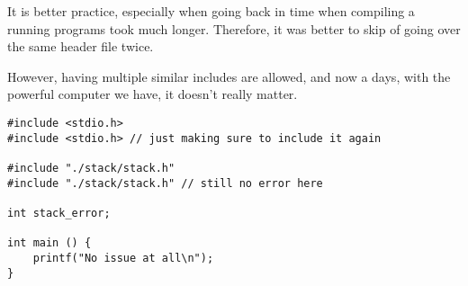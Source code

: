 
It is better practice, especially when going back in time when compiling a running programs took much longer. Therefore, it was better to skip of going over the same header file twice.

However, having multiple similar includes are allowed, and now a days, with the powerful computer we have, it doesn't really matter.



\begin{lstlisting}
#include <stdio.h>
#include <stdio.h> // just making sure to include it again

#include "./stack/stack.h"
#include "./stack/stack.h" // still no error here

int stack_error;

int main () {
    printf("No issue at all\n");
}
\end{lstlisting}

